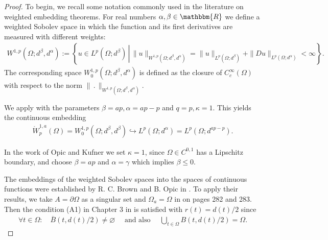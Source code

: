 \documentclass[12pt,a4paper,twoside]{article}
\newcommand{\R}{\mathbbm {R}}
\newcommand {\cb}[1] {\tikz[baseline=(char.base)]{
            \node[shape=circle,draw,inner sep=2pt] (char) {\itshape{\textbf{#1}}};}}
\begin{document}
\begin{proof} To begin, we recall some notation commonly used in the literature on weighted embedding theorems. For real numbers $\alpha,\beta\in\R$  we define a weighted Sobolev space in which the function and its first derivatives are measured with different weights:
\begin{align*}
    W^{1,p}(\Omega; d^\beta, d^\alpha):= 
    \left\{ u \in L^p(\Omega;d^\beta)
    \, \left| \, \|u\|_{W^{1,p}(\Omega; d^\beta, d^\alpha)}
    = \|u\|_{L^p(\Omega;d^\beta)}+ \|Du\|_{L^p(\Omega;d^\alpha)}<\infty\right\} \right. .
\end{align*}  
The corresponding space $ W^{1,p}_0(\Omega; d^\beta, d^\alpha)$ is defined as the closure of  $C^\infty_c(\Omega)$ with respect to the norm $\|\, . \, \|_{W^{1,p}(\Omega; d^\beta, d^\alpha)}$.

\noindent \cb a  We apply \cite[p.274 Theorem 19.10]{opic1990hardy} with the parameters $\beta=ap, \alpha=ap-p$ and $q=p, \kappa=1$. This yields the continuous embedding
\begin{align*}
   \mathring{W}^{1,a}_p(\Omega)
   =
   W^{1,p}_0(\Omega;d^{\beta},d^{\beta})
   \hookrightarrow
   L^p(\Omega; d^\alpha)=L^p(\Omega; d^{ap-p}).
\end{align*}

\noindent \cb b
In the work of Opic and Kufner \cite[p.275 Theorem 19.12]{opic1990hardy} we set $\kappa =1$, since $\Omega\in C^{0,1}$  has a Lipschitz boundary, and choose $\beta = ap$ and $\alpha=\gamma$ which implies   $\beta \le 0$. 

\noindent \cb c The embeddings of the weighted Sobolev spaces into the spaces of continuous functions were established by R. C. Brown and B. Opic in \cite{brown1992embeddings}. To apply their results, we take $A=\partial \Omega$ as a singular set and $\Omega_a=\Omega$ in \cite{brown1992embeddings} on pages 282 and 283. Then the condition (A1) in Chapter 3 in \cite{brown1992embeddings} is satisfied with $r(t) =d(t)/2$ since
 \begin{align*}
     \forall t\in \Omega: \quad\overline{B}(t,d(t)/2)\not=\varnothing
     \quad \text{ and also }
     \quad
     \bigcup_{t\in\Omega}{B}(t,d(t)/2) = \Omega.
 \end{align*}


\end{proof}
\end{document}
